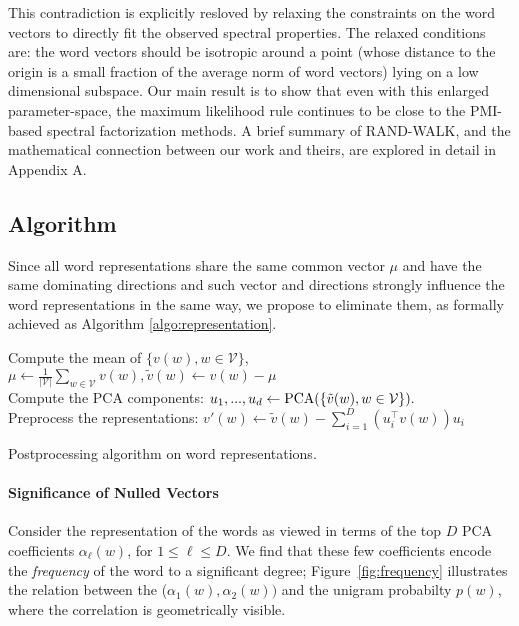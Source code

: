 \documentclass{article} \usepackage{acl2017,times}
\begin{document}
This contradiction is  explicitly resloved by relaxing the constraints on the word vectors to directly fit the observed spectral properties.  The relaxed conditions are: the word vectors should be isotropic around a point (whose distance to the origin is a  small fraction of the average norm of word vectors) lying on a low dimensional subspace. Our main result is to show that even with this enlarged parameter-space, the maximum likelihood rule continues to be close to the PMI-based spectral factorization methods.  A brief summary of RAND-WALK, and the mathematical connection between our work and theirs, are explored in detail in Appendix A.





\subsection{Algorithm}
\label{sec:algorithm} Since all word representations share the same common vector $\mu$ and have the same dominating directions  and such vector and directions strongly influence the word representations in the same way, we propose to eliminate them, as formally achieved as Algorithm \ref{algo:representation}.

\begin{algorithm}[!h]
Compute the mean of $\{v(w), w\in \mathcal{V}\}$,
$ \mu \leftarrow \frac{1}{|\mathcal{V}|} \sum_{w\in \mathcal{V}} v(w), \tilde{v}(w) \leftarrow v(w) - \mu$  \\
Compute the PCA components:
$u_1,...,u_d \leftarrow {\rm PCA}(\{\tilde{v}(w), w\in \mathcal{V}\}).$ \\
Preprocess the representations:
$v'(w) \leftarrow \tilde{v}(w) - \sum_{i=1}^D \left(u_i^{\top} v(w)\right) u_i$ \\
\caption{Postprocessing algorithm on word representations.}
\label{algo:representation}
\end{algorithm}



\paragraph{Significance of Nulled Vectors}
Consider the representation of the words as viewed in terms of the top $D$ PCA  coefficients $\alpha_{\ell}(w)$, for $1\leq \ell \leq D$.    
We  find that  these few coefficients   encode the {\em frequency} of the  word  to a  significant degree;  Figure~\ref{fig:frequency} illustrates the relation between the ($\alpha_{1}(w),\alpha_2(w))$ and the unigram  probabilty $p(w)$, where the correlation is geometrically visible.
\end{document}
